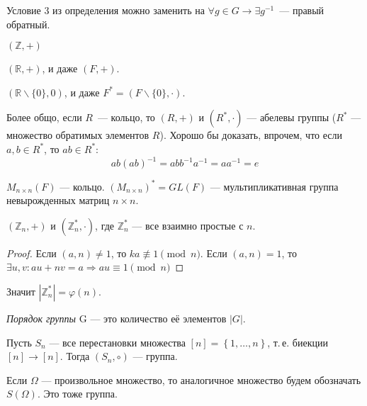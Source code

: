 \begin{exercise}
  Условие 3 из определения можно заменить на $\forall g \in G \to \exists g^{-1}$~--- правый обратный.
\end{exercise}

\begin{example}
	$(\mathbb{Z}, +)$
\end{example}

\begin{example}
  $(\mathbb{R}, +)$, и даже $(F, +)$.
\end{example}

\begin{example}
  $(\mathbb{R}\backslash\{0\}, 0)$, и даже $F^* = (F\backslash\{0\}, \cdot)$.
\end{example}

\begin{remark*}
  Более общо, если $R$~--- кольцо, то $(R, +)$ и $(R^*, \cdot)$ --- абелевы группы ($R^*$ --- множество обратимых элементов $R$).
  Хорошо бы доказать, впрочем, что если $a, b \in R^*$, то $ab \in R^*$:
  \begin{equation*}
	ab(ab)^{-1} = abb^{-1}a^{-1} = aa^{-1} = e
  \end{equation*}
\end{remark*}

\begin{example}
  $M_{n\times n}(F)$ --- кольцо. $(M_{n\times n})^* = GL(F)$ --- мультипликативная группа невырожденных матриц $n\times n$.
\end{example}

\begin{example}
  $(\mathbb{Z}_n, +)$ и $(\mathbb{Z}_n^*, \cdot)$, где $\mathbb{Z}_n^*$ --- все взаимно простые с $n$.
\end{example}

\begin{proof}
  Если $(a, n) \neq 1$, то $ka \not\equiv 1 \pmod{n}$. Если $(a, n) = 1$, то $\exists u, v: au + nv = a	\Rightarrow	au \equiv 1 \pmod{n}$
\end{proof}
Значит $|\mathbb{Z}_n^*| = \varphi(n)$.

\begin{define*}
  \emph{Порядок группы} G --- это количество её элементов $|G|$.
\end{define*}

\begin{example}
  Пусть $S_n$ --- все перестановки множества $[n] = \left\{ 1, \ldots, n \right\}$, т.\,е. биекции $[n] \to [n]$. Тогда $(S_n, \circ)$ --- группа.

  Если $\Omega$ --- произвольное множество, то аналогичное множество будем обозначать $S(\Omega)$. Это тоже группа.
\end{example}

